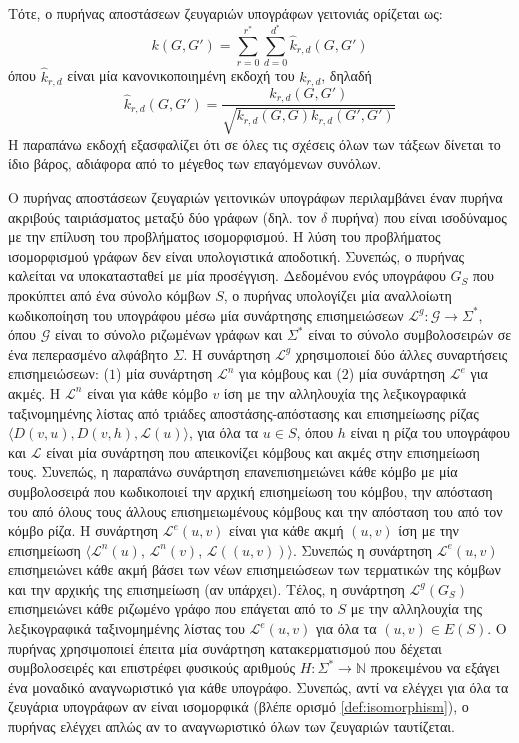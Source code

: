 Τότε, ο πυρήνας αποστάσεων ζευγαριών υπογράφων γειτονιάς ορίζεται ως:
\begin{equation}
    k(G, G') = \sum_{r=0}^{r^*} \sum_{d=0}^{d^*} \hat{k}_{r,d}(G, G')
\end{equation}
όπου $\hat{k}_{r,d}$ είναι μία κανονικοποιημένη εκδοχή του $k_{r,d}$, δηλαδή
\begin{equation*}
    \hat{k}_{r,d}(G,G') = \frac{k_{r,d}(G,G')}{\sqrt{k_{r,d}(G,G) k_{r,d}(G',G')}}
\end{equation*}
Η παραπάνω εκδοχή εξασφαλίζει ότι σε όλες τις σχέσεις όλων των τάξεων δίνεται το ίδιο βάρος, αδιάφορα από το μέγεθος των επαγόμενων συνόλων.\par
Ο πυρήνας αποστάσεων ζευγαριών γειτονικών υπογράφων περιλαμβάνει έναν πυρήνα ακριβούς ταιριάσματος μεταξύ δύο γράφων (δηλ. τον $\delta$ πυρήνα) που είναι ισοδύναμος με την επίλυση του προβλήματος ισομορφισμού.
Η λύση του προβλήματος ισομορφισμού γράφων δεν είναι υπολογιστικά αποδοτική.
Συνεπώς, ο πυρήνας καλείται να υποκατασταθεί με μία προσέγγιση.
Δεδομένου ενός υπογράφου $G_S$ που προκύπτει από ένα σύνολο κόμβων $S$, ο πυρήνας υπολογίζει μία αναλλοίωτη κωδικοποίηση του υπογράφου μέσω μία συνάρτησης επισημειώσεων $\mathcal{L}^g : \mathcal{G} \rightarrow \Sigma^*$, όπου $\mathcal{G}$ είναι το σύνολο ριζωμένων γράφων και $\Sigma^*$ είναι το σύνολο συμβολοσειρών σε ένα πεπερασμένο αλφάβητο $\Sigma$.
Η συνάρτηση $\mathcal{L}^g$ χρησιμοποιεί δύο άλλες συναρτήσεις επισημειώσεων: ($1$) μία συνάρτηση $\mathcal{L}^n$ για κόμβους και ($2$) μία συνάρτηση $\mathcal{L}^e$ για ακμές.
Η $\mathcal{L}^n$ είναι για κάθε κόμβο $v$ ίση με την αλληλουχία της λεξικογραφικά ταξινομημένης λίστας από τριάδες αποστάσης-απόστασης και επισημείωσης ρίζας $\langle D(v,u), D(v,h), \mathcal{L}(u) \rangle$, για όλα τα $u \in S$, όπου $h$ είναι η ρίζα του υπογράφου και $\mathcal{L}$ είναι μία συνάρτηση που απεικονίζει κόμβους και ακμές στην επισημείωση τους.
Συνεπώς, η παραπάνω συνάρτηση επανεπισημειώνει κάθε κόμβο με μία συμβολοσειρά που κωδικοποιεί την αρχική επισημείωση του κόμβου, την απόσταση του από όλους τους άλλους επισημειωμένους κόμβους και την απόσταση του από τον κόμβο ρίζα.
Η συνάρτηση $\mathcal{L}^e(u,v)$ είναι για κάθε ακμή $(u,v)$ ίση με την επισημείωση $\langle \mathcal{L}^n(u)$, $\mathcal{L}^n(v)$, $\mathcal{L}((u,v)) \rangle$.
Συνεπώς η συνάρτηση $\mathcal{L}^e(u,v)$ επισημειώνει κάθε ακμή βάσει των νέων επισημειώσεων των τερματικών της κόμβων και την αρχικής της επισημείωση (αν υπάρχει).
Τέλος, η συνάρτηση $\mathcal{L}^g(G_S)$ επισημειώνει κάθε ριζωμένο γράφο που επάγεται από το $S$ με την αλληλουχία της λεξικογραφικά ταξινομημένης λίστας του $\mathcal{L}^e(u,v)$ για όλα τα $(u,v) \in E(S)$.
Ο πυρήνας χρησιμοποιεί έπειτα μία συνάρτηση κατακερματισμού που δέχεται συμβολοσειρές και επιστρέφει φυσικούς αριθμούς $H : \Sigma^* \rightarrow \mathbb{N}$ προκειμένου να εξάγει ένα μοναδικό αναγνωριστικό για κάθε υπογράφο.
Συνεπώς, αντί να ελέγχει για όλα τα ζευγάρια υπογράφων αν είναι ισομορφικά (βλέπε ορισμό \ref{def:isomorphism}), ο πυρήνας ελέγχει απλώς αν το αναγνωριστικό όλων των ζευγαριών ταυτίζεται.


